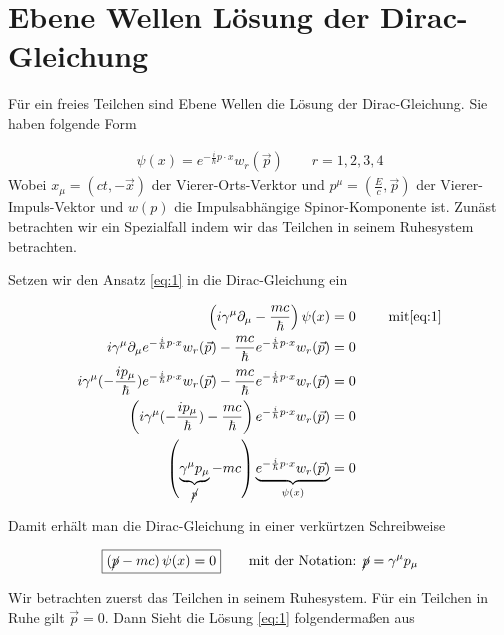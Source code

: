 
\usepackage{amsmath} 





\section*{Ebene Wellen Lösung der Dirac-Gleichung}

Für ein freies Teilchen sind Ebene Wellen die Lösung der Dirac-Gleichung. Sie haben folgende Form

\begin{align}
  \label{eq:1}
  \psi(x) = e^{-\frac{i}{\hbar}p\cdot x}w_r(\vec p) \qquad r=1,2,3,4
 \end{align}
Wobei \(x_\mu=(ct,-\vec x)\) der Vierer-Orts-Verktor und \(p^{\mu}=(\frac{E}{c},\vec p)\) der Vierer-Impuls-Vektor und \(w(p)\) die Impulsabhängige Spinor-Komponente ist. Zunäst betrachten wir ein Spezialfall indem wir das Teilchen in seinem Ruhesystem betrachten. 


Setzen wir den Ansatz \eqref{eq:1} in die Dirac-Gleichung ein

\begin{align}
  \label{eq:3}
  \left(i \gamma^\mu \partial_\mu-\frac{mc}{\hbar}  \right)\psi(x) &= 0 \qquad\text{ mit} \eqref{eq:1}   \notag \\
 i \gamma^\mu \partial_\mu  e^{-\frac{i}{\hbar}p\cdot x}w_r(\vec p) -\frac{mc}{\hbar} e^{-\frac{i}{\hbar}p\cdot x}w_r(\vec p)  &= 0  \notag \\
 i \gamma^\mu (-\frac{ip_\mu}{\hbar}) e^{-\frac{i}{\hbar}p\cdot x}w_r(\vec p) -\frac{mc}{\hbar} e^{-\frac{i}{\hbar}p\cdot x}w_r(\vec p)  &= 0  \notag \\
 \left(i \gamma^\mu (-\frac{ip_\mu}{\hbar}) -\frac{mc}{\hbar}\right) e^{-\frac{i}{\hbar}p\cdot x}w_r(\vec p)  &= 0  \notag \\
 \left(\underbr{ \gamma^\mu p_\mu}_{\cancel p} - mc\right)\underbr{ e^{-\frac{i}{\hbar}p\cdot x}w_r(\vec p)}_{\psi(x)}  &= 0 
\end{align}

Damit erhält man die Dirac-Gleichung in einer verkürtzen Schreibweise

\begin{align}
  \label{eq:4}
 \boxed{ \left(\cancel p - mc\right)\psi(x) = 0 }\qquad \text{mit der Notation: }\cancel p = \gamma^\mu p_\mu
\end{align}


Wir betrachten zuerst das Teilchen in seinem Ruhesystem. Für ein Teilchen in Ruhe gilt \(\vec p=0\). Dann Sieht die Lösung \eqref{eq:1} folgendermaßen aus

